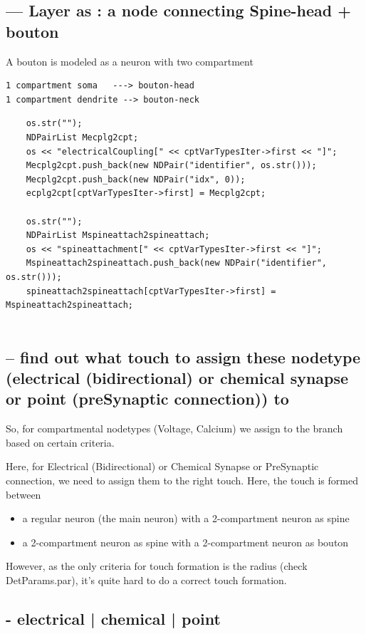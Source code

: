 \subsection{--- Layer as : a node connecting Spine-head + bouton}

A bouton is modeled as a neuron with two compartment
\begin{verbatim}
1 compartment soma   ---> bouton-head
1 compartment dendrite --> bouton-neck
\end{verbatim}

\begin{verbatim}
    os.str("");
    NDPairList Mecplg2cpt;
    os << "electricalCoupling[" << cptVarTypesIter->first << "]";
    Mecplg2cpt.push_back(new NDPair("identifier", os.str()));
    Mecplg2cpt.push_back(new NDPair("idx", 0));
    ecplg2cpt[cptVarTypesIter->first] = Mecplg2cpt;

    os.str("");
    NDPairList Mspineattach2spineattach;
    os << "spineattachment[" << cptVarTypesIter->first << "]";
    Mspineattach2spineattach.push_back(new NDPair("identifier", os.str()));
    spineattach2spineattach[cptVarTypesIter->first] = Mspineattach2spineattach;
    
\end{verbatim}

\subsection{-- find out what touch to assign these nodetype (electrical
(bidirectional) or chemical synapse or point (preSynaptic connection)) to}

So, for compartmental nodetypes (Voltage, Calcium) we assign to the branch based
on certain criteria.

Here, for Electrical (Bidirectional) or Chemical Synapse or PreSynaptic
connection, we need to assign them to the right touch. Here, the touch is formed
between 
\begin{itemize}
  \item a regular neuron (the main neuron) with a 2-compartment neuron as spine
  \item a 2-compartment neuron as spine with a 2-compartment neuron as bouton
\end{itemize}

However, as the only criteria for touch formation is the radius (check
DetParams.par), it's quite hard to do a correct touch formation. 

\subsection{- electrical | chemical | point}

